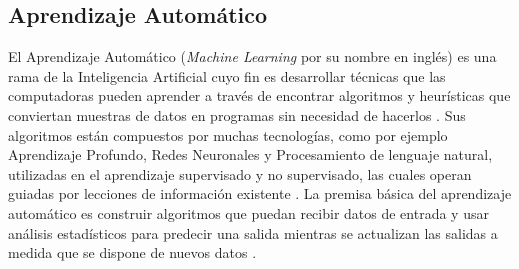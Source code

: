 \subsection{Aprendizaje Automático}
El Aprendizaje Automático (\textit{Machine Learning} por su nombre en inglés) es una rama de la Inteligencia Artificial cuyo fin es desarrollar técnicas que las computadoras pueden aprender a través de encontrar algoritmos y heurísticas que conviertan muestras de datos en programas sin necesidad de hacerlos \parencite{bk_russell2009intart}. Sus algoritmos están compuestos por muchas tecnologías, como por ejemplo Aprendizaje Profundo, Redes Neuronales y Procesamiento de lenguaje natural, utilizadas en el aprendizaje supervisado y no supervisado, las cuales operan guiadas por lecciones de información existente \parencite{gl_gartner2019ml}. La premisa básica del aprendizaje automático es construir algoritmos que puedan recibir datos de entrada y usar análisis estadísticos para predecir una salida mientras se actualizan las salidas a medida que se dispone de nuevos datos \parencite{bk_alpaydin2014ml}.

